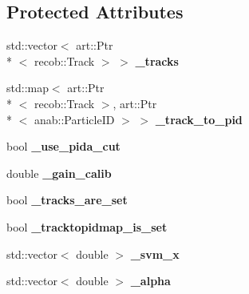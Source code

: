 \subsection*{Protected Attributes}
\begin{DoxyCompactItemize}
\item 
\hypertarget{classubana_1_1MuonCandidateFinder_aa7c96f8b784bcd81512e9c444806f740}{std\-::vector$<$ art\-::\-Ptr\\*
$<$ recob\-::\-Track $>$ $>$ {\bfseries \-\_\-tracks}}\label{classubana_1_1MuonCandidateFinder_aa7c96f8b784bcd81512e9c444806f740}

\item 
\hypertarget{classubana_1_1MuonCandidateFinder_a673e9b7d68a2c3c734fd92ec6e0a87ee}{std\-::map$<$ art\-::\-Ptr\\*
$<$ recob\-::\-Track $>$, art\-::\-Ptr\\*
$<$ anab\-::\-Particle\-I\-D $>$ $>$ {\bfseries \-\_\-track\-\_\-to\-\_\-pid}}\label{classubana_1_1MuonCandidateFinder_a673e9b7d68a2c3c734fd92ec6e0a87ee}

\item 
\hypertarget{classubana_1_1MuonCandidateFinder_a4f0eef92dcbab86d2470da30739be235}{bool {\bfseries \-\_\-use\-\_\-pida\-\_\-cut}}\label{classubana_1_1MuonCandidateFinder_a4f0eef92dcbab86d2470da30739be235}

\item 
\hypertarget{classubana_1_1MuonCandidateFinder_ac017744471453eca475acf27c0ccc1a7}{double {\bfseries \-\_\-gain\-\_\-calib}}\label{classubana_1_1MuonCandidateFinder_ac017744471453eca475acf27c0ccc1a7}

\item 
\hypertarget{classubana_1_1MuonCandidateFinder_a7275929ef39e422785e7a6dd9d95f5eb}{bool {\bfseries \-\_\-tracks\-\_\-are\-\_\-set}}\label{classubana_1_1MuonCandidateFinder_a7275929ef39e422785e7a6dd9d95f5eb}

\item 
\hypertarget{classubana_1_1MuonCandidateFinder_a46cb4b649e6d2d9b2e6c7641a9fd548a}{bool {\bfseries \-\_\-tracktopidmap\-\_\-is\-\_\-set}}\label{classubana_1_1MuonCandidateFinder_a46cb4b649e6d2d9b2e6c7641a9fd548a}

\item 
\hypertarget{classubana_1_1MuonCandidateFinder_ab09c2e9c8419eb520850e8e8ce3d9518}{std\-::vector$<$ double $>$ {\bfseries \-\_\-svm\-\_\-x}}\label{classubana_1_1MuonCandidateFinder_ab09c2e9c8419eb520850e8e8ce3d9518}

\item 
\hypertarget{classubana_1_1MuonCandidateFinder_acb4356a1692fa77c2784d09599ce8fa1}{std\-::vector$<$ double $>$ {\bfseries \-\_\-alpha}}\label{classubana_1_1MuonCandidateFinder_acb4356a1692fa77c2784d09599ce8fa1}


\end{DoxyCompactItemize}
